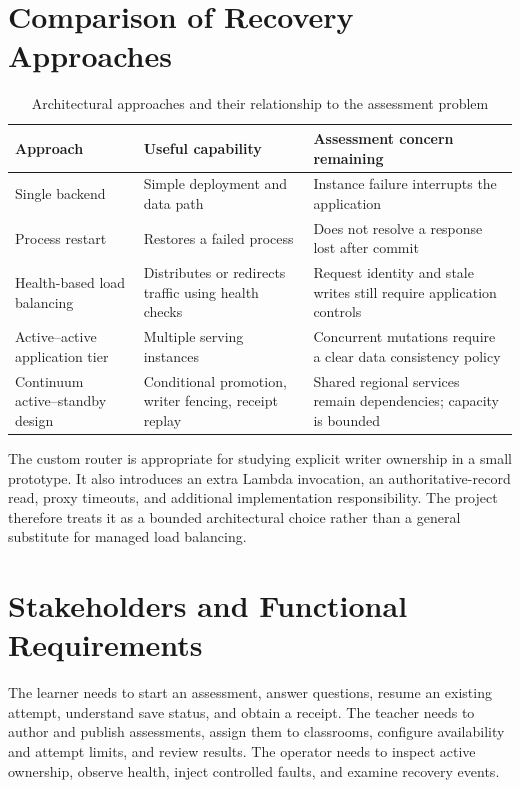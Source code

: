 \section{Comparison of Recovery Approaches}

\begin{table}[H]\centering\small
\caption{Architectural approaches and their relationship to the assessment problem}\label{tab:approaches}
\begin{tabularx}{\textwidth}{@{}L{29mm}YY@{}}\toprule
\textbf{Approach} & \textbf{Useful capability} & \textbf{Assessment concern remaining}\\\midrule
Single backend & Simple deployment and data path & Instance failure interrupts the application\\
Process restart & Restores a failed process & Does not resolve a response lost after commit\\
Health-based load balancing & Distributes or redirects traffic using health checks & Request identity and stale writes still require application controls\\
Active--active application tier & Multiple serving instances & Concurrent mutations require a clear data consistency policy\\
Continuum active--standby design & Conditional promotion, writer fencing, receipt replay & Shared regional services remain dependencies; capacity is bounded\\\bottomrule
\end{tabularx}\end{table}

The custom router is appropriate for studying explicit writer ownership in a small prototype. It also introduces an extra Lambda invocation, an authoritative-record read, proxy timeouts, and additional implementation responsibility. The project therefore treats it as a bounded architectural choice rather than a general substitute for managed load balancing.
\section{Stakeholders and Functional Requirements}
The learner needs to start an assessment, answer questions, resume an existing attempt, understand save status, and obtain a receipt. The teacher needs to author and publish assessments, assign them to classrooms, configure availability and attempt limits, and review results. The operator needs to inspect active ownership, observe health, inject controlled faults, and examine recovery events.


